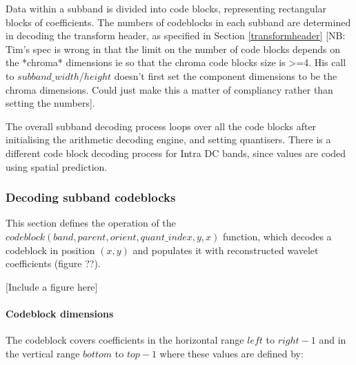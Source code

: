 Data within a subband is divided into code blocks,
representing rectangular blocks of coefficients. The numbers of codeblocks
in each subband are determined in decoding the transform header, as specified
in Section \ref{transformheader} [NB: Tim's spec is wrong in that the limit on
the number of code blocks depends on the *chroma* dimensions ie so that the
chroma code blocks size is >=4. His call to $subband\_width/height$ doesn't first 
set the component dimensions to be the chroma dimensions. Could just make this a 
matter of compliancy rather than setting the numbers].

The overall subband decoding process loops over all the code blocks after initialising the
arithmetic decoding engine, and setting quantisers. There is a different code block decoding
process for Intra DC bands, since values are coded using spatial prediction.

\begin{pseudo*}
  \bsELSE
  \bsEND
    \bsEND
  \bsEND

  \bsEND

\bsEND

\end{pseudo*}


\subsubsection{Decoding subband codeblocks}

\label{codeblocks}

This section defines the operation of the 
$codeblock(band,parent,orient,quant\_index,y,x)$ function, which decodes a 
codeblock in position $(x,y)$ and populates it with reconstructed 
wavelet coefficients (figure ??).

[Include a figure here]

\paragraph{Codeblock dimensions\newline}

The codeblock covers coefficients in the horizontal range $left$ to $right-1$ and in the vertical
range $bottom$ to $top-1$ where these values are defined by:

